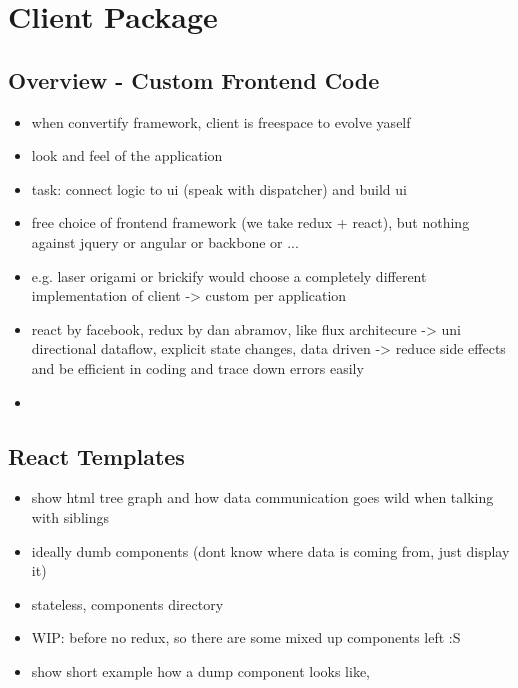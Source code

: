\documentclass[../ClassicThesis.tex]{subfiles}
\begin{document}
\section{Client Package}

\subsection{Overview - Custom Frontend Code}

\begin{itemize}
\item when convertify framework, client is freespace to evolve yaself
\item look and feel of the application
\item task: connect logic to ui (speak with dispatcher) and build ui
\item free choice of frontend framework (we take redux + react), but nothing
  against jquery or angular or backbone or ...
\item e.g. laser origami or brickify would choose a completely different
  implementation of client -> custom per application
\item react by facebook, redux by dan abramov, like flux architecure -> uni
  directional dataflow, explicit state changes, data driven -> reduce side
  effects and be efficient in coding and trace down errors easily
\item {}
\end{itemize}

\subsection{React Templates}

\begin{itemize}
\item show html tree graph and how data communication goes wild when talking
  with siblings
\item ideally dumb components (dont know where data is coming from, just display
  it)
\item stateless, components directory
\item WIP: before no redux, so there are some mixed up components left :S
\item show short example how a dump component looks like, 
\end{itemize}
\end{document}
